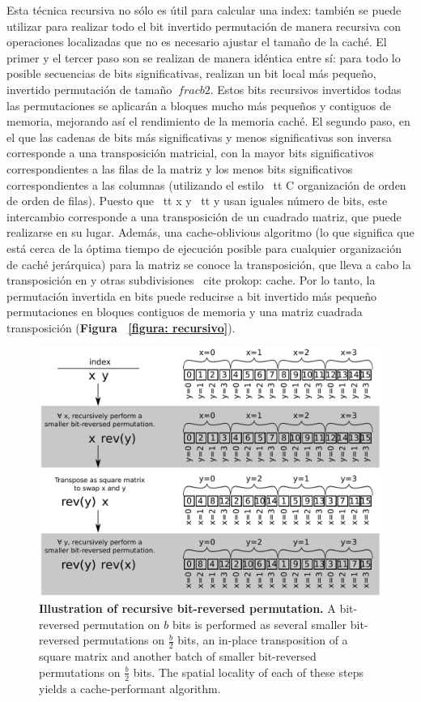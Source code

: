﻿\documentclass[10pt]{article}
\begin{document}
{Esta técnica recursiva no sólo es útil para calcular una index: también se puede utilizar para realizar todo el bit invertido permutación de manera recursiva con operaciones localizadas que no es necesario ajustar el tamaño de la caché. El primer y el tercer paso son se realizan de manera idéntica entre sí: para todo lo posible secuencias de bits significativas, realizan un bit local más pequeño, invertido permutación de tamaño $ \ frac {b} {2} $. Estos bits recursivos invertidos todas las permutaciones se aplicarán a bloques mucho más pequeños y contiguos de memoria, mejorando así el rendimiento de la memoria caché. El segundo paso, en el que las cadenas de bits más significativas y menos significativas son inversa corresponde a una transposición matricial, con la mayor bits significativos correspondientes a las filas de la matriz y los menos bits significativos correspondientes a las columnas (utilizando el estilo {\ tt C} organización de orden de orden de filas). Puesto que {\ tt x} y {\ tt y} usan iguales número de bits, este intercambio corresponde a una transposición de un cuadrado matriz, que puede realizarse en su lugar. Además, una cache-oblivious algoritmo (lo que significa que está cerca de la óptima tiempo de ejecución posible para cualquier organización de caché jerárquica) para la matriz se conoce la transposición, que lleva a cabo la transposición en y otras subdivisiones \ cite {prokop: cache}. Por lo tanto, la permutación invertida en bits puede reducirse a bit invertido más pequeño permutaciones en bloques contiguos de memoria y una matriz cuadrada transposición ({\bf Figura ~\ref{figura: recursivo}}).
\begin{figure}
\centering
\includegraphics[width=5in]{cartoons/recursive.pdf}
\caption{{\bf Illustration of recursive bit-reversed permutation.} A
  bit-reversed permutation on $b$ bits is performed as several smaller
  bit-reversed permutations on $\frac{b}{2}$ bits, an in-place
  transposition of a square matrix and another batch of smaller
  bit-reversed permutations on $\frac{b}{2}$ bits. The spatial
  locality of each of these steps yields a cache-performant algorithm.
  \label{figure:recursive}}
\end{figure}

}
\end{document}
